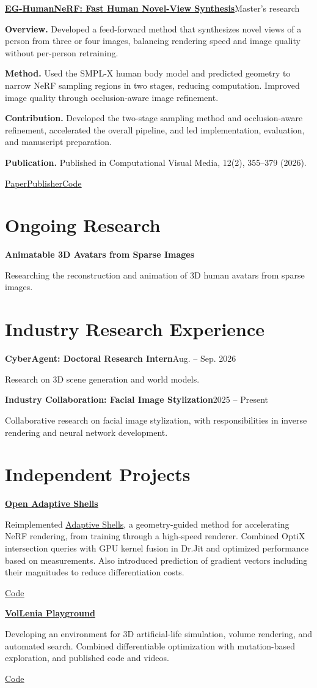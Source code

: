 \documentclass[a4paper,11pt]{article}
\newcommand{\entry}[2]{\Needspace{4\baselineskip}\par\vspace{5pt}\textbf{#1}\hfill #2\par}
\newcommand{\field}[2]{\par\textbf{#1.} #2\par}
\newcommand{\link}[2]{\href{#1}{\underline{#2}}}
\begin{document}
\entry{\href{https://doi.org/10.26599/CVM.2025.9450508}{EG-HumanNeRF: Fast Human Novel-View Synthesis}}{Master's research}
\field{Overview}{Developed a feed-forward method that synthesizes novel views of a person from three or four images, balancing rendering speed and image quality without per-person retraining.}
\field{Method}{Used the SMPL-X human body model and predicted geometry to narrow NeRF sampling regions in two stages, reducing computation. Improved image quality through occlusion-aware image refinement.}
\field{Contribution}{Developed the two-stage sampling method and occlusion-aware refinement, accelerated the overall pipeline, and led implementation, evaluation, and manuscript preparation.}
\field{Publication}{Published in Computational Visual Media, 12(2), 355--379 (2026).}
\link{https://doi.org/10.26599/CVM.2025.9450508}{Paper}\quad \link{https://ieeexplore.ieee.org/document/11373444/}{Publisher}\quad \link{https://github.com/LarsPh/EG-HumanNeRF}{Code}

\section{Ongoing Research}
\entry{Animatable 3D Avatars from Sparse Images}{}
Researching the reconstruction and animation of 3D human avatars from sparse images.

\newpage
\section{Industry Research Experience}
\entry{CyberAgent: Doctoral Research Intern}{Aug. -- Sep. 2026}
Research on 3D scene generation and world models.
\entry{Industry Collaboration: Facial Image Stylization}{2025 -- Present}
Collaborative research on facial image stylization, with responsibilities in inverse rendering and neural network development.

\section{Independent Projects}
\entry{\href{https://github.com/LarsPh/open-adaptive-shells}{Open Adaptive Shells}}{}
Reimplemented \href{https://arxiv.org/abs/2311.10091}{Adaptive Shells}, a geometry-guided method for accelerating NeRF rendering, from training through a high-speed renderer. Combined OptiX intersection queries with GPU kernel fusion in Dr.Jit and optimized performance based on measurements. Also introduced prediction of gradient vectors including their magnitudes to reduce differentiation costs.
\par\link{https://github.com/LarsPh/open-adaptive-shells}{Code}
\entry{\href{https://github.com/LarsPh/VolLenia_Playground}{VolLenia Playground}}{}
Developing an environment for 3D artificial-life simulation, volume rendering, and automated search. Combined differentiable optimization with mutation-based exploration, and published code and videos.
\par\link{https://github.com/LarsPh/VolLenia_Playground}{Code}
\end{document}

